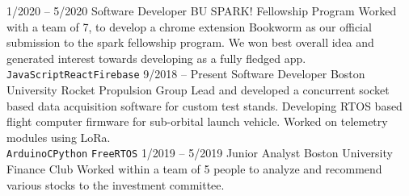 \documentclass[9pt]{developercv} %
\begin{document}
\begin{entrylist}
	\entry
		{1/2020 -- 5/2020}
		{Software Developer}
		{BU SPARK! Fellowship Program}
		{Worked with a team of 7, to develop a chrome extension Bookworm as our official submission to the spark fellowship program.
		We won best overall idea and generated interest towards developing as a fully fledged app.\\
		\texttt{JavaScript}\slashsep\texttt{React}\slashsep\texttt{Firebase}}
	\entry
		{9/2018 -- Present}
		{Software Developer}	
		{Boston University Rocket Propulsion Group}
		{Lead and developed a concurrent socket based data acquisition software for custom test stands.
		Developing RTOS based flight computer firmware for sub-orbital launch vehicle. Worked 
		on telemetry modules using LoRa. \\\texttt{Arduino}\slashsep\texttt{C}\slashsep\texttt{Python}
		\slashsep\texttt{FreeRTOS}}
	\entry
		{1/2019 -- 5/2019}
		{Junior Analyst}
		{Boston University Finance Club}
		{Worked within a team of 5 people to analyze and recommend various stocks to the investment committee.}
		
\end{entrylist}
\end{document}
